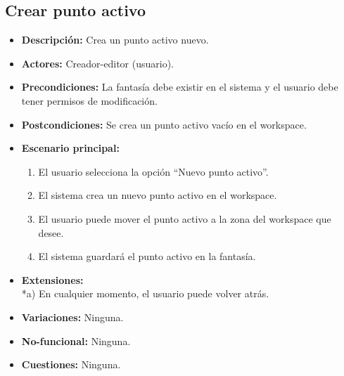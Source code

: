 \subsection{Crear punto activo}
\begin{itemize}
	\item \textbf{Descripción:} Crea un punto activo nuevo.
	\item \textbf{Actores:} Creador-editor (usuario).
	\item \textbf{Precondiciones:} La fantasía debe existir en el sistema y el usuario debe tener permisos de modificación.
	\item \textbf{Postcondiciones:} Se crea un punto activo vacío en el workspace.
	\item \textbf{Escenario principal:}
	\begin{enumerate}
		\item El usuario selecciona la opción ``Nuevo punto activo''.
		\item El sistema crea un nuevo punto activo en el workspace.
		\item El usuario puede mover el punto activo a la zona del workspace que desee.
		\item El sistema guardará el punto activo en la fantasía.
	\end{enumerate}
	\item \textbf{Extensiones:} \\ *a) En cualquier momento, el usuario puede volver atrás.
	\item \textbf{Variaciones:} Ninguna.
	\item \textbf{No-funcional:} Ninguna.
	\item \textbf{Cuestiones:} Ninguna.
\end{itemize}

